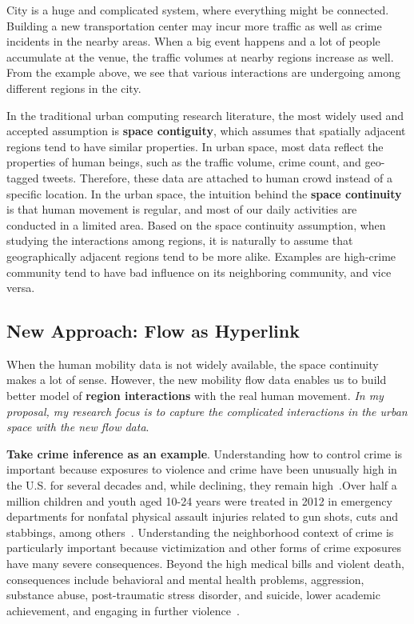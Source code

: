 City is a huge and complicated system, where everything might be connected. Building a new transportation center may incur more traffic as well as crime incidents in the nearby areas. When a big event happens and a lot of people accumulate at the venue, the traffic volumes at nearby regions increase as well. From the example above, we see that various interactions are undergoing among different regions in the city.


In the traditional urban computing research literature, the most widely used and accepted assumption is \textbf{space contiguity}, which assumes that spatially adjacent regions tend to have similar properties. In urban space, most data reflect the properties of human beings, such as the traffic volume, crime count, and geo-tagged tweets. Therefore, these data are attached to human crowd instead of a specific location. 
In the urban space, the intuition behind the \textbf{space continuity} is that human movement is regular, and most of our daily activities are conducted in a limited area. Based on the space continuity assumption, when studying the interactions among regions, it is naturally to assume that geographically adjacent regions tend to be more alike.  Examples are high-crime community tend to have bad influence on its neighboring community, and vice versa.



\subsection{New Approach: Flow as Hyperlink}

When the human mobility data is not widely available, the space continuity makes a lot of sense. However, the new mobility flow data enables us to build better model of \textbf{region interactions} with the real human movement.
\emph{In my proposal, my research focus is to capture the complicated interactions in the urban space with the new flow data}.



\textbf{Take crime inference as an example}. Understanding how to control crime is important because exposures to violence and crime have been unusually high in the U.S. for several decades and, while declining, they remain high~\cite{Baum05, Fink08}.Over half a million children and youth aged 10-24 years were treated in 2012 in emergency departments for nonfatal physical assault injuries related to gun shots, cuts and stabbings, among others~\cite{cdc15}.  Understanding the neighborhood context of crime is particularly important because victimization and other forms of crime exposures have many severe consequences.  Beyond the high medical bills and violent death, consequences include behavioral and mental health problems, aggression, substance abuse, post-traumatic stress disorder, and suicide, lower academic achievement, and engaging in further violence~\cite{Grai15}. 


